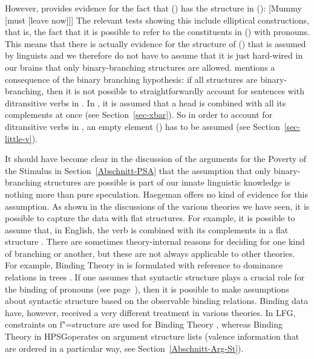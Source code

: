 \noindent
However, \citet[]{Haegeman94a-u} provides evidence for the fact that () has the structure in ():
\ea
{}[Mummy [must [leave now]]]
\z
The relevant tests showing this include elliptical constructions, that is, the fact that it is possible to
refer to the constituents in () with pronouns. This means that there is actually evidence for
the structure of () that is assumed by linguists and we therefore do not have to assume that
it is just hard-wired in our brains that only binary-branching structures are allowed. \citet[]{Haegeman94a-u} mentions a consequence of the binary branching hypothesis: if all structures are
binary-branching, then it is not possible to straightforwardly account for sentences with
ditransitive verbs in \xbart. In \xbart, it is assumed that a head is combined with all its
complements at once (see Section~\ref{sec-xbar}). So in order to account for ditransitive verbs in
\xbart, an empty element (\littlev) has to be assumed (see Section~\ref{sec-little-v}).

It should have become clear in the discussion of the arguments for the Poverty of the Stimulus in Section~\ref{Abschnitt-PSA} that
the assumption that only binary-branching structures are possible is part of our innate linguistic knowledge is nothing more than pure
speculation. Haegeman offers no kind of evidence for this assumption. As shown in the discussions of the various theories we have seen,  
it is possible to capture the data with flat structures. For example, it is possible to assume that, in English, the verb
is combined with its complements in a flat structure \citep[]{ps2}. There are sometimes theory-internal reasons for
deciding for one kind of branching or another, but these are not always applicable to other theories. For example, Binding Theory
in \gbt is formulated with reference to dominance relations in trees \citep[]{Chomsky81a}. If one assumes that syntactic structure plays
a crucial role for the binding of pronouns (see page~\pageref{Seite-Bindungstheorie}), then it is possible to make assumptions about syntactic
structure based on the observable binding relations. Binding data have, however, received a very different treatment in various theories.
In LFG\indexlfg, constraints on f"=structure are used for Binding Theory \citep{Dalrymple93a}, whereas Binding Theory
in HPSG\indexhpsg operates on argument structure lists (valence information that are ordered in a particular way,
see Section~\ref{Abschnitt-Arg-St}).
 
